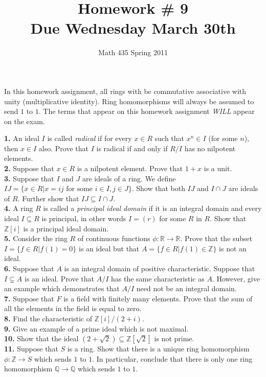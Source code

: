 \documentclass[oneside,10pt]{amsart}
\title{Homework \# 9\\Due Wednesday March 30th}
\author{Math 435 Spring 2011}
\begin{document}
\maketitle

In this homework assignment, all rings with be commutative associative with unity (multiplicative identity).  Ring homomorphisms will always be assumed to send $1$ to $1$.  The terms that appear on this homework assignment \emph{WILL} appear on the exam.

\noindent
{\bf 1.}  An ideal $I$ is called \emph{radical} if for every $x \in R$ such that $x^n \in I$ (for some $n$), then $x \in I$ also.  Prove that $I$ is radical if and only if $R/I$ has no nilpotent elements.\\
{\bf 2.}  Suppose that $x \in R$ is a nilpotent element.  Prove that $1 + x$ is a unit.\\
{\bf 3.}  Suppose that $I$ and $J$ are ideals of a ring.  We define $IJ = \{ x \in R | x = ij \text{ for some } i \in I, j \in J \}$.  Show that both $IJ$ and $I \cap J$ are ideals of $R$.  Further show that $IJ \subseteq I \cap J$.  \\
{\bf 4.}  A ring $R$ is called a \emph{principal ideal domain} if it is an integral domain and every ideal $I \subseteq R$ is principal, in other words $I = (r)$ for some $R$ in $R$.  Show that $\mathbb{Z}[i]$ is a principal ideal domain.  \\
{\bf 5.}  Consider the ring $R$ of continuous functions $\phi : \mathbb{R} \to \mathbb{R}$.  Prove that the subset $I = \{ f \in R | f(1) = 0\}$ is an ideal but that $A = \{f \in R | f(1) \in \mathbb{Z} \}$ is not an ideal.\\
{\bf 6.}  Suppose that $A$ is an integral domain of positive characteristic.  Suppose that $I \subsetneq A$ is an ideal.  Prove that $A/I$ has the same characteristic as $A$.  However, give an example which demonstrates that $A/I$ need not be an integral domain.\\
{\bf 7.}  Suppose that $F$ is a field with finitely many elements.  Prove that the sum of all the elements in the field is equal to zero.\\
{\bf 8.}  Find the characteristic of $\mathbb{Z}[i]/ (2 + i)$.  \\
{\bf 9.}  Give an example of a prime ideal which is not maximal.  \\
{\bf 10.}  Show that the ideal $(2 + \sqrt{2}) \subseteq \mathbb{Z}[\sqrt{2}]$ is not prime.\\
{\bf 11.}  Suppose that $S$ is a ring.  Show that there is a unique ring homomorphism $\phi : \mathbb{Z} \to S$ which sends $1$ to $1$.  In particular, conclude that there is only one ring homomorphism $\mathbb{Q} \to \mathbb{Q}$ which sends $1$ to $1$.   \\
\end{document}

